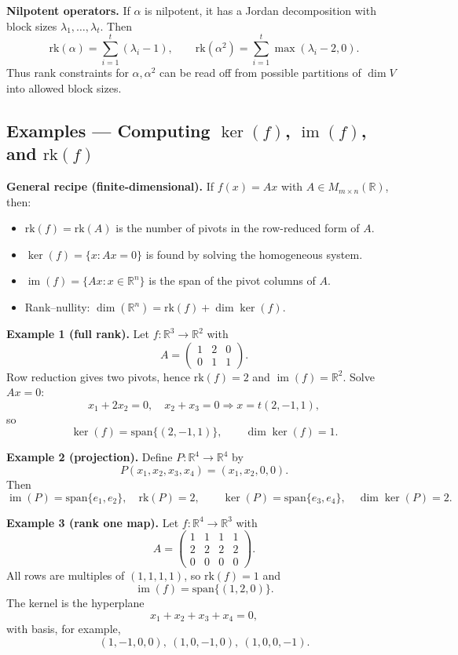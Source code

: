 \documentclass[12pt,a4paper]{article}
\theoremstyle{plain}
\theoremstyle{definition}      %
\begin{document}
\medskip
\noindent\textbf{Nilpotent operators.}
If $\alpha$ is nilpotent, it has a Jordan decomposition with block sizes $\lambda_1,\dots,\lambda_t$.
Then
\[
\mathrm{rk}(\alpha)=\sum_{i=1}^t(\lambda_i-1),\qquad
\mathrm{rk}(\alpha^2)=\sum_{i=1}^t\max(\lambda_i-2,0).
\]
Thus rank constraints for $\alpha,\alpha^2$ can be read off from possible partitions of $\dim V$ into allowed block sizes.


\subsection*{Examples — Computing $\ker(f)$, $\operatorname{im}(f)$, and $\mathrm{rk}(f)$}

\textbf{General recipe (finite-dimensional).}
If $f(x)=Ax$ with $A\in M_{m\times n}(\mathbb R)$, then:
\begin{itemize}
	\item $\mathrm{rk}(f)=\mathrm{rk}(A)$ is the number of pivots in the row-reduced form of $A$.
	\item $\ker(f)=\{x:Ax=0\}$ is found by solving the homogeneous system.
	\item $\operatorname{im}(f)=\{Ax:x\in\mathbb R^n\}$ is the span of the pivot columns of $A$.
	\item Rank--nullity: $\dim(\mathbb R^n)=\mathrm{rk}(f)+\dim\ker(f)$.
\end{itemize}

\bigskip
\textbf{Example 1 (full rank).}
Let $f:\mathbb R^3\to\mathbb R^2$ with
\[
A=\begin{pmatrix}1&2&0\\0&1&1\end{pmatrix}.
\]
Row reduction gives two pivots, hence $\mathrm{rk}(f)=2$ and $\operatorname{im}(f)=\mathbb R^2$.
Solve $Ax=0$:
\[
x_1+2x_2=0,\quad x_2+x_3=0
\Rightarrow x=t(2,-1,1),
\]
so
\[
\ker(f)=\mathrm{span}\{(2,-1,1)\},\qquad \dim\ker(f)=1.
\]

\bigskip
\textbf{Example 2 (projection).}
Define $P:\mathbb R^4\to\mathbb R^4$ by
\[
P(x_1,x_2,x_3,x_4)=(x_1,x_2,0,0).
\]
Then
\[
\operatorname{im}(P)=\mathrm{span}\{e_1,e_2\},\quad \mathrm{rk}(P)=2,\qquad
\ker(P)=\mathrm{span}\{e_3,e_4\},\quad \dim\ker(P)=2.
\]

\bigskip
\textbf{Example 3 (rank one map).}
Let $f:\mathbb R^4\to\mathbb R^3$ with
\[
A=\begin{pmatrix}
	1&1&1&1\\
	2&2&2&2\\
	0&0&0&0
\end{pmatrix}.
\]
All rows are multiples of $(1,1,1,1)$, so $\mathrm{rk}(f)=1$ and
\[
\operatorname{im}(f)=\mathrm{span}\{(1,2,0)\}.
\]
The kernel is the hyperplane
\[
x_1+x_2+x_3+x_4=0,
\]
with basis, for example,
\[
(1,-1,0,0),\ (1,0,-1,0),\ (1,0,0,-1).
\]
\end{document}
